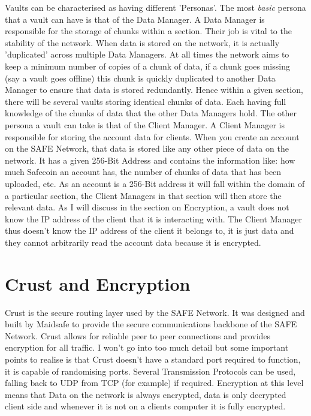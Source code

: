 Vaults can be characterised as having different 'Personas'. The most \textit{basic} persona that a vault can have is that of the Data Manager. A Data Manager is responsible for the storage of chunks within a section. Their job is vital to the stability of the network. When data is stored on the network, it is actually 'duplicated' across multiple Data Managers. At all times the network aims to keep a minimum number of copies of a chunk of data, if a chunk goes missing (say a vault goes offline) this chunk is quickly duplicated to another Data Manager to ensure that data is stored redundantly. Hence within a given section, there will be several vaults storing identical chunks of data. Each having full knowledge of the chunks of data that the other Data Managers hold. The other persona a vault can take is that of the Client Manager. A Client Manager is responsible for storing the account data for clients. When you create an account on the SAFE Network, that data is stored like any other piece of data on the network. It has a given 256-Bit Address and contains the information like: how much Safecoin an account has, the number of chunks of data that has been uploaded, etc. As an account is a 256-Bit address it will fall within the domain of a particular section, the Client Managers in that section will then store the relevant data. As I will discuss in the section on Encryption, a vault does not know the IP address of the client that it is interacting with. The Client Manager thus doesn't know the IP address of the client it belongs to, it is just data and they cannot arbitrarily read the account data because it is encrypted.

\section{Crust and Encryption}

Crust is the secure routing layer used by the SAFE Network. It was designed and built by Maidsafe to provide the secure communications backbone of the SAFE Network. Crust allows for reliable peer to peer connections and provides encryption for all traffic. I won't go into too much detail but some important points to realise is that Crust doesn't have a standard port required to function, it is capable of randomising ports. Several Transmission Protocols can be used, falling back to UDP from TCP (for example) if required. Encryption at this level means that Data on the network is always encrypted, data is only decrypted client side and whenever it is not on a clients computer it is fully encrypted.

